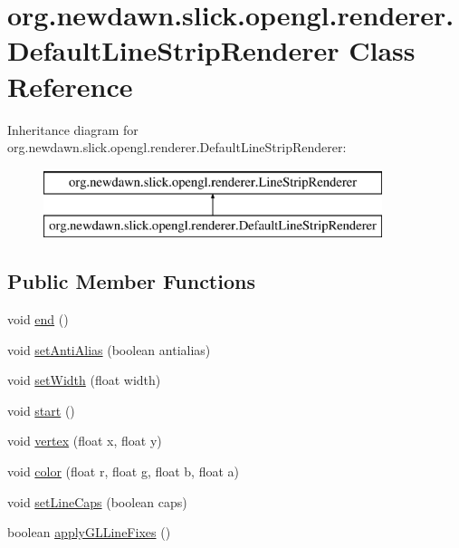 \hypertarget{classorg_1_1newdawn_1_1slick_1_1opengl_1_1renderer_1_1_default_line_strip_renderer}{}\section{org.\+newdawn.\+slick.\+opengl.\+renderer.\+Default\+Line\+Strip\+Renderer Class Reference}
\label{classorg_1_1newdawn_1_1slick_1_1opengl_1_1renderer_1_1_default_line_strip_renderer}
Inheritance diagram for org.\+newdawn.\+slick.\+opengl.\+renderer.\+Default\+Line\+Strip\+Renderer\+:\begin{figure}[H]
\begin{center}
\leavevmode
\includegraphics[height=2.000000cm]{classorg_1_1newdawn_1_1slick_1_1opengl_1_1renderer_1_1_default_line_strip_renderer}
\end{center}
\end{figure}
\subsection*{Public Member Functions}
\begin{DoxyCompactItemize}
\item 
void \mbox{\hyperlink{classorg_1_1newdawn_1_1slick_1_1opengl_1_1renderer_1_1_default_line_strip_renderer_a544d66d8f579f2f5fd3cf62fdf0c4038}{end}} ()
\item 
void \mbox{\hyperlink{classorg_1_1newdawn_1_1slick_1_1opengl_1_1renderer_1_1_default_line_strip_renderer_adec638ecbe7cb11adb68d6ad05e47940}{set\+Anti\+Alias}} (boolean antialias)
\item 
void \mbox{\hyperlink{classorg_1_1newdawn_1_1slick_1_1opengl_1_1renderer_1_1_default_line_strip_renderer_a0e31016a63b0166c556eb10309fd4603}{set\+Width}} (float width)
\item 
void \mbox{\hyperlink{classorg_1_1newdawn_1_1slick_1_1opengl_1_1renderer_1_1_default_line_strip_renderer_a6d1f2a49396c421d3ab71e6c472db291}{start}} ()
\item 
void \mbox{\hyperlink{classorg_1_1newdawn_1_1slick_1_1opengl_1_1renderer_1_1_default_line_strip_renderer_a61da8b730261c056d7ba8c00be607162}{vertex}} (float x, float y)
\item 
void \mbox{\hyperlink{classorg_1_1newdawn_1_1slick_1_1opengl_1_1renderer_1_1_default_line_strip_renderer_ae236140384772f798e2d6e9a1faacdd5}{color}} (float r, float g, float b, float a)
\item 
void \mbox{\hyperlink{classorg_1_1newdawn_1_1slick_1_1opengl_1_1renderer_1_1_default_line_strip_renderer_a4ab21f80fe9663e729febb2206e201a5}{set\+Line\+Caps}} (boolean caps)
\item 
boolean \mbox{\hyperlink{classorg_1_1newdawn_1_1slick_1_1opengl_1_1renderer_1_1_default_line_strip_renderer_ab8658df4f3b6dfae473b3c708dadfdfb}{apply\+G\+L\+Line\+Fixes}} ()
\end{DoxyCompactItemize}
